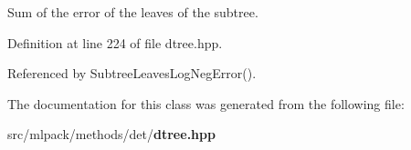 Sum of the error of the leaves of the subtree. 



Definition at line 224 of file dtree.\-hpp.



Referenced by Subtree\-Leaves\-Log\-Neg\-Error().



The documentation for this class was generated from the following file\-:\begin{DoxyCompactItemize}
\item 
src/mlpack/methods/det/{\bf dtree.\-hpp}\end{DoxyCompactItemize}
